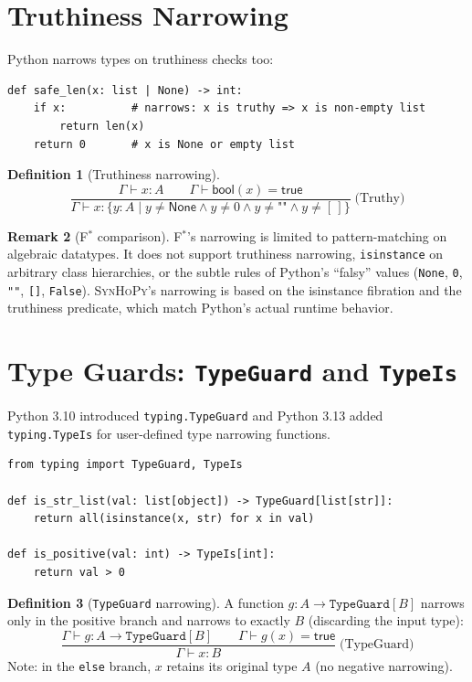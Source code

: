 \documentclass[11pt,a4paper]{report}
\theoremstyle{definition}
\newtheorem{definition}{Definition}[chapter]
\newtheorem{remark}[definition]{Remark}
\theoremstyle{plain}
\newcommand{\fstar}{F$^{*}$}
\newcommand{\synhopy}{\textsc{SynHoPy}}
\begin{document}
\section{Truthiness Narrowing}

Python narrows types on truthiness checks too:

\begin{lstlisting}[style=python]
def safe_len(x: list | None) -> int:
    if x:          # narrows: x is truthy => x is non-empty list
        return len(x)
    return 0       # x is None or empty list
\end{lstlisting}

\begin{definition}[Truthiness narrowing]
\[
  \frac{
    \Gamma \vdash x : A \qquad
    \Gamma \vdash \mathsf{bool}(x) = \mathsf{true}
  }{
    \Gamma \vdash x : \{y : A \mid y \neq \mathsf{None} \wedge y \neq 0
      \wedge y \neq \texttt{""} \wedge y \neq [\,]\}
  }
  \;\text{(Truthy)}
\]
\end{definition}

\begin{remark}[\fstar{} comparison]
\fstar{}'s narrowing is limited to pattern-matching on algebraic datatypes.
It does not support truthiness narrowing, \texttt{isinstance} on arbitrary
class hierarchies, or the subtle rules of Python's ``falsy'' values
(\texttt{None}, \texttt{0}, \texttt{""}, \texttt{[]}, \texttt{False}).
\synhopy{}'s narrowing is based on the isinstance fibration and the
truthiness predicate, which match Python's actual runtime behavior.
\end{remark}

\section{Type Guards: \texttt{TypeGuard} and \texttt{TypeIs}}

Python 3.10 introduced \texttt{typing.TypeGuard} and Python 3.13 added
\texttt{typing.TypeIs} for user-defined type narrowing functions.

\begin{lstlisting}[style=python]
from typing import TypeGuard, TypeIs

def is_str_list(val: list[object]) -> TypeGuard[list[str]]:
    return all(isinstance(x, str) for x in val)

def is_positive(val: int) -> TypeIs[int]:
    return val > 0
\end{lstlisting}

\begin{definition}[\texttt{TypeGuard} narrowing]
A function $g : A \to \texttt{TypeGuard}[B]$ narrows only in the positive branch
and narrows to exactly $B$ (discarding the input type):
\[
  \frac{
    \Gamma \vdash g : A \to \texttt{TypeGuard}[B] \qquad
    \Gamma \vdash g(x) = \mathsf{true}
  }{
    \Gamma \vdash x : B
  }
  \;\text{(TypeGuard)}
\]
Note: in the \texttt{else} branch, $x$ retains its original type $A$ (no
negative narrowing).
\end{definition}
\end{document}
